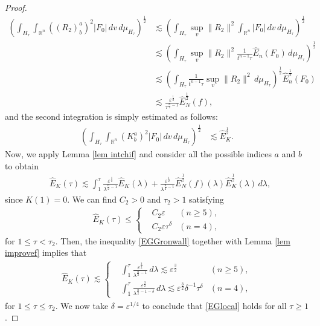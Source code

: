 \documentclass{article}
\newcommand{\bbr}{{\mathbb R}}
\newcommand{\bbrn}{{\bbr^n}}
\begin{document}
\begin{proof}
\begin{align*}
\left( \int_{ H_\tau } \int_\bbrn ( ( R_2 )^a_b )^2 | F_0 | \, d v \, d \mu_{ H_\tau } \right)^{ \frac{ 1 }{ 2 } }
& \lesssim \left( \int_{ H_\tau } \sup_v \| R_2 \|^2 \int_\bbrn | F_0 | \, d v \, d \mu_{ H_\tau } \right)^{ \frac{ 1 }{ 2 } } \\
& \lesssim \left( \int_{ H_\tau } \sup_v \| R_2 \|^2 \frac{ 1 }{ t^{ n - 1 } \tau } \hat{ E }_n ( F_0 ) \, d \mu_{ H_\tau } \right)^{ \frac{ 1 }{ 2 } } \\
& \lesssim \left( \int_{ H_\tau } \frac{ 1 }{ t^{ n - 1 } \tau } \sup_v \| R_2 \|^2 \, d \mu_{ H_\tau } \right)^{ \frac{ 1 }{ 2 } } \hat{ E }_n^{ \frac{ 1 }{ 2 } } ( F_0 ) \\
& \lesssim \frac{ \varepsilon^{ \frac{ 1 }{ 2 } } }{ \tau^{ \frac{ n }{ 2 } - 1 } } \hat{ E }_N^{ \frac{ 1 }{ 2 } } ( f ) ,
\end{align*}
and the second integration is simply estimated as follows:
\begin{align*}
\left( \int_{ H_\tau } \int_\bbrn ( K^a_b )^2 | F_0 | \, d v \, d \mu_{ H_\tau } \right)^{ \frac{ 1 }{ 2 } } & \lesssim \hat{ E }^{ \frac{ 1 }{ 2 } }_K .
\end{align*}
Now, we apply Lemma \ref{lem intchif} and consider all the possible indices $ a $ and $ b $ to obtain
\begin{align}
& \hat{ E }_K ( \tau ) \lesssim \int_1^\tau \frac{ \varepsilon^{ \frac{ 1 }{ 2 } } }{ \lambda^{ \frac{ n }{ 2 } - 1 } } \hat{ E }_K ( \lambda ) + \frac{ \varepsilon^{ \frac{ 1 }{ 2 } } }{ \lambda^{ \frac{ n }{ 2 } - 1 } } \hat{ E }_N^{ \frac{ 1 }{ 2 } } ( f ) ( \lambda ) \hat{ E }^{ \frac{ 1 }{ 2 } }_K ( \lambda ) \, d \lambda , \label{EGGronwall}
\end{align}
since $ K ( 1 ) = 0 $. We can find $ C_2 > 0 $ and $ \tau_2 > 1 $ satisfying
\begin{align}
\hat{ E }_K ( \tau ) \leq
\left\{
\begin{aligned}
& C_2 \varepsilon & ( n \geq 5 ) , \\
& C_2 \varepsilon \tau^\delta & ( n = 4 ) ,
\end{aligned}
\right. \label{EGlocal}
\end{align}
for $ 1 \leq \tau < \tau_2 $. Then, the inequality \eqref{EGGronwall} together with Lemma \ref{lem improvef} implies that
\begin{align*}
\hat{ E }_K ( \tau ) \lesssim
\left\{
\begin{aligned}
& \int_1^\tau \frac{ \varepsilon^{ \frac{ 3 }{ 2 } } }{ \lambda^{ \frac{ n }{ 2 } - 1 } } \, d \lambda \lesssim \varepsilon^{ \frac{ 3 }{ 2 } } & ( n \geq 5 ) , \\
& \int_1^\tau \frac{ \varepsilon^{ \frac{ 3 }{ 2 } } }{ \lambda^{ \frac{ n }{ 2 } - 1 - \delta } } \, d \lambda \lesssim \varepsilon^{ \frac{ 3 }{ 2 } } \delta^{ - 1 } \tau^\delta & ( n = 4 ) ,
\end{aligned}
\right.
\end{align*}
for $ 1 \leq \tau \leq \tau_2 $. We now take $ \delta = \varepsilon^{ 1 / 4 } $ to conclude that \eqref{EGlocal} holds for all $ \tau \geq 1 $.
\end{proof}
\end{document}
